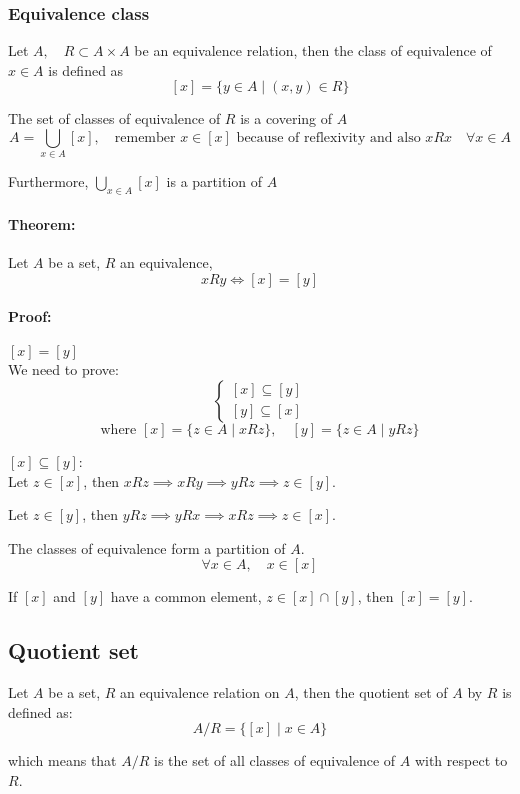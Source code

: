 \documentclass[11pt]{article}
\begin{document}
\subsubsection{Equivalence class}
Let $A, \quad R \subset A \times A$ be an equivalence relation, then the class of equivalence of $x \in A$ is defined as 
\[
[x] = \{y \in A \mid (x,y) \in R\}
\]

The set of classes of equivalence of $R$ is a covering of $A$
\[
A = \bigcup_{x \in A}[x], \quad \text{remember } x \in [x] \text{ because of reflexivity and also } xRx \quad \forall x \in A
\]

Furthermore, $\bigcup_{x \in A}[x]$ is a partition of $A$

\paragraph{Theorem:} Let $A$ be a set, $R$ an equivalence,
\[
xRy \Longleftrightarrow [x] = [y]
\]

\paragraph{Proof:} $[x] = [y]$ \\
We need to prove:
\[
\begin{cases}
    [x] \subseteq [y] \\
    [y] \subseteq [x]
\end{cases}
\]
\[
\text{where } [x] = \{z \in A \mid xRz\}, \quad [y] = \{z \in A \mid yRz\}
\]

$[x] \subseteq [y]$: \\
Let $z \in [x]$, then $xRz \implies xRy \implies yRz \implies z \in [y]$.

Let $z \in [y]$, then $yRz \implies yRx \implies xRz \implies z \in [x]$.

The classes of equivalence form a partition of $A$.
\[
\forall x \in A, \quad x \in [x]
\]

If $[x]$ and $[y]$ have a common element, $z \in [x] \cap [y]$, then $[x] = [y]$.

\subsection{Quotient set}
Let $A$ be a set, $R$ an equivalence relation on $A$, then the quotient set of $A$ by $R$ is defined as:
\[
A/R = \{[x] \mid x \in A\}
\]

which means that $A/R$ is the set of all classes of equivalence of $A$ with respect to $R$.
\end{document}

